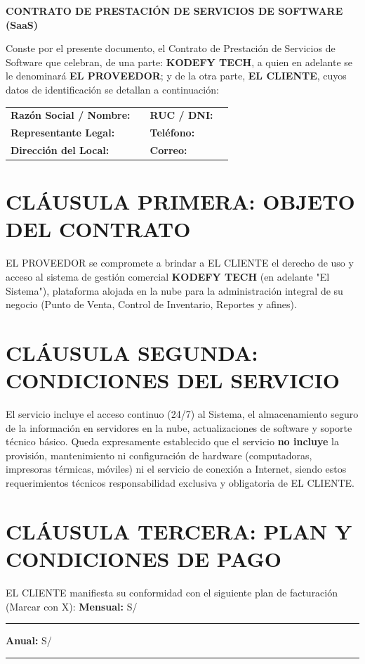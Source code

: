 \documentclass[10pt,a4paper]{article}
\begin{document}
\begin{center}
    \large\textbf{CONTRATO DE PRESTACIÓN DE SERVICIOS DE SOFTWARE (SaaS)}
\end{center}

Conste por el presente documento, el Contrato de Prestación de Servicios de Software que celebran, de una parte: \textbf{KODEFY TECH}, a quien en adelante se le denominará \textbf{EL PROVEEDOR}; y de la otra parte, \textbf{EL CLIENTE}, cuyos datos de identificación se detallan a continuación:

\vspace{4pt}
\noindent
\begin{tabularx}{\textwidth}{@{} l X l X @{}}
\textbf{Razón Social / Nombre:} & \hrulefill & \textbf{RUC / DNI:} & \hrulefill \\
\textbf{Representante Legal:} & \hrulefill & \textbf{Teléfono:} & \hrulefill \\
\textbf{Dirección del Local:} & \hrulefill & \textbf{Correo:} & \hrulefill \\
\end{tabularx}
\vspace{4pt}

\section*{CLÁUSULA PRIMERA: OBJETO DEL CONTRATO}
EL PROVEEDOR se compromete a brindar a EL CLIENTE el derecho de uso y acceso al sistema de gestión comercial \textbf{KODEFY TECH} (en adelante "El Sistema"), plataforma alojada en la nube para la administración integral de su negocio (Punto de Venta, Control de Inventario, Reportes y afines).

\section*{CLÁUSULA SEGUNDA: CONDICIONES DEL SERVICIO}
El servicio incluye el acceso continuo (24/7) al Sistema, el almacenamiento seguro de la información en servidores en la nube, actualizaciones de software y soporte técnico básico. Queda expresamente establecido que el servicio \textbf{no incluye} la provisión, mantenimiento ni configuración de hardware (computadoras, impresoras térmicas, móviles) ni el servicio de conexión a Internet, siendo estos requerimientos técnicos responsabilidad exclusiva y obligatoria de EL CLIENTE.

\section*{CLÁUSULA TERCERA: PLAN Y CONDICIONES DE PAGO}
EL CLIENTE manifiesta su conformidad con el siguiente plan de facturación (Marcar con X): \quad 
[ \hspace{0.2cm} ] \textbf{Mensual:} S/ \rule{1.5cm}{0.4pt} \quad 
[ \hspace{0.2cm} ] \textbf{Anual:} S/ \rule{1.5cm}{0.4pt} 
\end{document}
